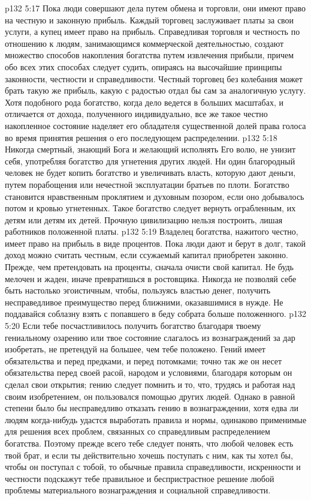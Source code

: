 \vs p132 5:17 \bibnobreakspace Пока люди совершают дела путем обмена и торговли, они имеют право на честную и законную прибыль. Каждый торговец заслуживает платы за свои услуги, а купец имеет право на прибыль. Справедливая торговля и честность по отношению к людям, занимающимся коммерческой деятельностью, создают множество способов накопления богатства путем извлечения прибыли, причем обо всех этих способах следует судить, опираясь на высочайшие принципы законности, честности и справедливости. Честный торговец без колебания может брать такую же прибыль, какую с радостью отдал бы сам за аналогичную услугу. Хотя подобного рода богатство, когда дело ведется в больших масштабах, и отличается от дохода, полученного индивидуально, все же такое честно накопленное состояние наделяет его обладателя существенной долей права голоса во время принятия решения о его последующем распределении.
\vs p132 5:18 \bibnobreakspace Никогда смертный, знающий Бога и желающий исполнять Его волю, не унизит себя, употребляя богатство для угнетения других людей. Ни один благородный человек не будет копить богатство и увеличивать власть, которую дают деньги, путем порабощения или нечестной эксплуатации братьев по плоти. Богатство становится нравственным проклятием и духовным позором, если оно добывалось потом и кровью угнетенных. Такое богатство следует вернуть ограбленным, их детям или детям их детей. Прочную цивилизацию нельзя построить, лишая работников положенной платы.
\vs p132 5:19 \bibnobreakspace Владелец богатства, нажитого честно, имеет право на прибыль в виде процентов. Пока люди дают и берут в долг, такой доход можно считать честным, если ссужаемый капитал приобретен законно. Прежде, чем претендовать на проценты, сначала очисти свой капитал. Не будь мелочен и жаден, иначе превратишься в ростовщика. Никогда не позволяй себе быть настолько эгоистичным, чтобы, пользуясь властью денег, получить несправедливое преимущество перед ближними, оказавшимися в нужде. Не поддавайся соблазну взять с попавшего в беду собрата больше положенного.
\vs p132 5:20 \bibnobreakspace Если тебе посчастливилось получить богатство благодаря твоему гениальному озарению или твое состояние слагалось из вознаграждений за дар изобретать, не претендуй на большее, чем тебе положено. Гений имеет обязательства и перед предками, и перед потомками; точно так же он несет обязательства перед своей расой, народом и условиями, благодаря которым он сделал свои открытия; гению следует помнить и то, что, трудясь и работая над своим изобретением, он пользовался помощью других людей. Однако в равной степени было бы несправедливо отказать гению в вознаграждении, хотя едва ли людям когда\hyp{}нибудь удастся выработать правила и нормы, одинаково применимые для решения всех проблем, связанных со справедливым распределением богатства. Поэтому прежде всего тебе следует понять, что любой человек есть твой брат, и если ты действительно хочешь поступать с ним, как ты хотел бы, чтобы он поступал с тобой, то обычные правила справедливости, искренности и честности подскажут тебе правильное и беспристрастное решение любой проблемы материального вознаграждения и социальной справедливости.
